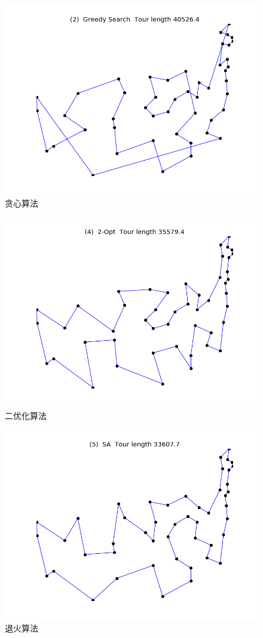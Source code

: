 \documentclass{article}
\begin{document}
\begin{CJK}{UTF8}{gkai}
\begin{figure}
	\centering
	\includegraphics[width=.7\linewidth]{00226}
	\caption{贪心算法}
	\label{fig:greedy}
\end{figure}

\begin{figure}
	\centering
	\includegraphics[width=.7\linewidth]{00322}
	\caption{二优化算法}
	\label{fig:2opt}
\end{figure}

\begin{figure}
	\centering
	\includegraphics[width=.7\linewidth]{02132}
	\caption{退火算法}
	\label{fig:sa}
\end{figure}


\end{CJK}
\end{document}
